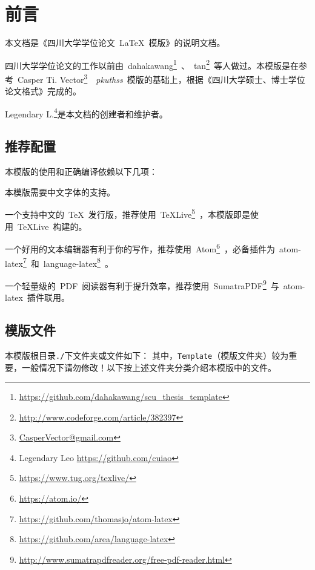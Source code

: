 \chapter{前言}
\label{Chap_Intro}
本文档是《四川大学学位论文~\LaTeX~模版》的说明文档。


四川大学学位论文的工作以前由~dahakawang\footnote{\url{https://github.com/dahakawang/scu_thesis_template}}~、~tan\footnote{\url{http://www.codeforge.com/article/382397}}~等人做过。本模版是在参考~Casper Ti. Vector\footnote{\url{CasperVector@gmail.com}}~~\emph{pkuthss}~模版\cite{pkuthss}的基础上，根据《四川大学硕士、博士学位论文格式》\cite{SCUDissertationFormat}完成的。


Legendary L.\footnote{Legendary Leo \url{https://github.com/cuiao}}是本文档的创建者和维护者。

\section{推荐配置}
本模版的使用和正确编译依赖以下几项：
\begin{description}[style=nextline,labelindent=2em,labelwidth=!]
	\item[中文字体] 本模版需要中文字体的支持。
	\item[\TeX~发行版] 一个支持中文的~\TeX~发行版，推荐使用~\TeX Live\footnote{\url{https://www.tug.org/texlive/}}~，本模版即是使用~\TeX Live~构建的。
	\item[文本编辑器] 一个好用的文本编辑器有利于你的写作，推荐使用~Atom\footnote{\url{https://atom.io/}}~，必备插件为~atom-latex\footnote{\url{https://github.com/thomasjo/atom-latex}}~和~language-latex\footnote{\url{https://github.com/area/language-latex}}~。
	\item[PDF~阅读器] 一个轻量级的~PDF~阅读器有利于提升效率，推荐使用~SumatraPDF\footnote{\url{http://www.sumatrapdfreader.org/free-pdf-reader.html}}~与~atom-latex~插件联用。
\end{description}


\section{模版文件}
本模版根目录\verb|./|下文件夹或文件如下：
其中，\verb|Template|（模版文件夹）较为重要，一般情况下请勿修改！以下按上述文件夹分类介绍本模版中的文件。

